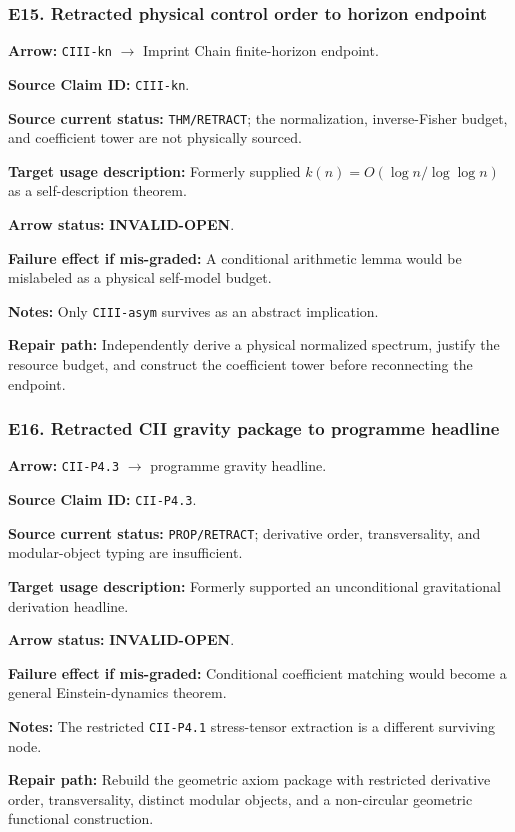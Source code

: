 \documentclass[12pt,a4paper]{article}
\begin{document}
\subsubsection*{E15. Retracted physical control order to horizon endpoint}
\noindent\textbf{Arrow:} \texttt{CIII-kn}
\(\to\) Imprint Chain finite-horizon endpoint.\par
\noindent\textbf{Source Claim ID:} \texttt{CIII-kn}.\par
\noindent\textbf{Source current status:} \texttt{THM/RETRACT}; the
normalization, inverse-Fisher budget, and coefficient tower are not
physically sourced.\par
\noindent\textbf{Target usage description:} Formerly supplied
\(k(n)=O(\log n/\log\log n)\) as a self-description theorem.\par
\noindent\textbf{Arrow status:} \textbf{INVALID-OPEN}.\par
\noindent\textbf{Failure effect if mis-graded:} A conditional arithmetic
lemma would be mislabeled as a physical self-model budget.\par
\noindent\textbf{Notes:} Only \texttt{CIII-asym} survives as an abstract
implication.\par
\noindent\textbf{Repair path:} Independently derive a physical normalized
spectrum, justify the resource budget, and construct the coefficient
tower before reconnecting the endpoint.\par

\subsubsection*{E16. Retracted CII gravity package to programme headline}
\noindent\textbf{Arrow:} \texttt{CII-P4.3}
\(\to\) programme gravity headline.\par
\noindent\textbf{Source Claim ID:} \texttt{CII-P4.3}.\par
\noindent\textbf{Source current status:} \texttt{PROP/RETRACT};
derivative order, transversality, and modular-object typing are
insufficient.\par
\noindent\textbf{Target usage description:} Formerly supported an
unconditional gravitational derivation headline.\par
\noindent\textbf{Arrow status:} \textbf{INVALID-OPEN}.\par
\noindent\textbf{Failure effect if mis-graded:} Conditional coefficient
matching would become a general Einstein-dynamics theorem.\par
\noindent\textbf{Notes:} The restricted \texttt{CII-P4.1}
stress-tensor extraction is a different surviving node.\par
\noindent\textbf{Repair path:} Rebuild the geometric axiom package with
restricted derivative order, transversality, distinct modular objects,
and a non-circular geometric functional construction.\par
\end{document}
